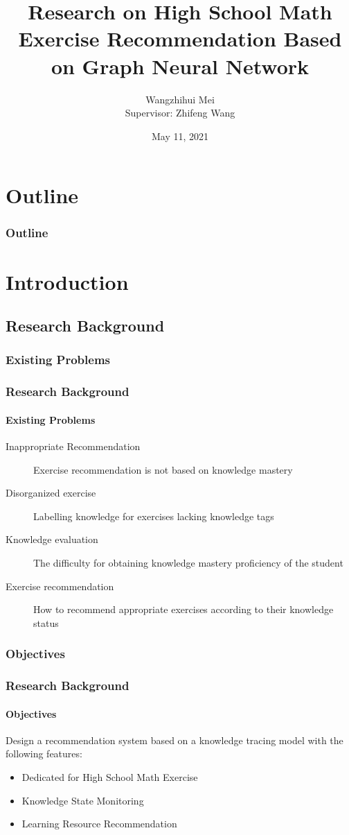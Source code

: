 \documentclass[10pt,aspectratio=43,mathserif]{beamer}
\title[Research on High School Math Exercise Recommendation Based on Graph Neural Network]{Research on High School Math Exercise Recommendation Based on Graph Neural Network}
\author[Wangzhihui Mei]{
  Wangzhihui Mei %
  \\\medskip
  Supervisor: Zhifeng Wang}
\institute[CCNU-UOW JI]{
  Central China Normal University Wollongong Joint Institute}
\date[\today]{May 11, 2021}
\begin{document}
\begin{frame}
	\titlepage
\end{frame}				%

\section{Outline}
\begin{frame}
	\frametitle{Outline}
	\tableofcontents
\end{frame}				%
\section{Introduction}
\subsection{Research Background}

\subsubsection{Existing Problems}
\begin{frame}
	\frametitle{Research Background}
	\framesubtitle{Existing Problems}
	\begin{description}
		\item[Inappropriate Recommendation] Exercise recommendation is not based on knowledge mastery
		\item[Disorganized exercise] Labelling knowledge for exercises lacking knowledge tags
		\item[Knowledge evaluation] The difficulty for obtaining knowledge mastery proficiency of the student
		\item[Exercise recommendation] How to recommend appropriate exercises according to their knowledge status
	\end{description}
\end{frame}


\subsubsection{Objectives}
\begin{frame}
	\frametitle{Research Background}
	\framesubtitle{Objectives}
	Design a recommendation system based on a knowledge tracing model with the following features:
	\begin{itemize}
		\item Dedicated for High School Math Exercise
		\item Knowledge State Monitoring
		\item Learning Resource Recommendation
	\end{itemize}
\end{frame}
\end{document}
